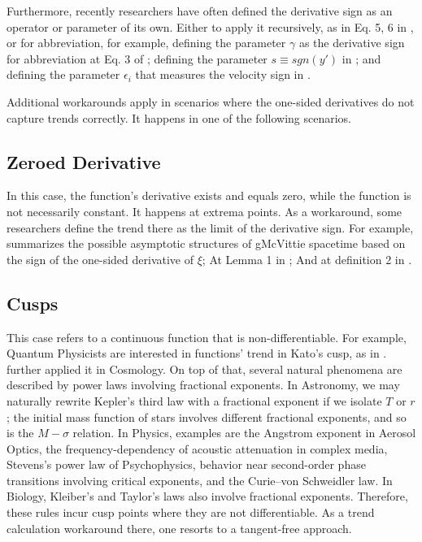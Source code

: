 \documentclass[11pt]{book}
\begin{document}
Furthermore, recently researchers have often defined the derivative
sign as an operator or parameter of its own. Either to apply it recursively,
as in Eq. 5, 6 in \cite{ma2017adversarial},
or for abbreviation, for example, defining the parameter $\gamma$
as the derivative sign for abbreviation at Eq. 3 of \cite{horng2002vehicle};
defining the parameter $s\equiv sgn\left(y'\right)$ in \cite{hasan2021training};
and defining the parameter $\epsilon_{i}$ that measures the velocity
sign in \cite{hasan2021training}.

Additional workarounds apply in scenarios where the one-sided derivatives
do not capture trends correctly. It happens in one of the following
scenarios.
\subsection{Zeroed Derivative}
In this case, the function's derivative exists and equals zero, while the function is not necessarily constant. It happens at extrema points. As a workaround, some researchers define the trend there as the limit of the derivative sign. For example, \cite{maciel2015cosmological} summarizes the possible asymptotic structures of gMcVittie spacetime based on the sign of the one-sided derivative of $\xi$; At Lemma 1 in \cite{seno2020sis}; And at definition 2 in \cite{ishitsubo2009experimental}.
\subsection{Cusps}
This case refers to a continuous function that is non-differentiable.
For example, Quantum Physicists are interested in functions' trend
in Kato's cusp, as in \cite{mumtaz2019deformation}.
\cite{arguelles2021formation}
further applied it in Cosmology. On top of that, several natural phenomena
are described by power laws involving fractional exponents. In Astronomy,
we may naturally rewrite Kepler's third law with a fractional exponent
if we isolate $T$ or $r$; the initial mass function of stars involves
different fractional exponents, and so is the $M-\sigma$ relation.
In Physics, examples are the Angstrom exponent in Aerosol Optics,
the frequency-dependency of acoustic attenuation in complex media,
Stevens's power law of Psychophysics, behavior near second-order phase
transitions involving critical exponents, and the Curie--von Schweidler
law. In Biology, Kleiber's and Taylor's laws also involve fractional
exponents. Therefore, these rules incur cusp points where they are not
differentiable. As a trend calculation workaround there, one resorts
to a tangent-free approach.
\end{document}
